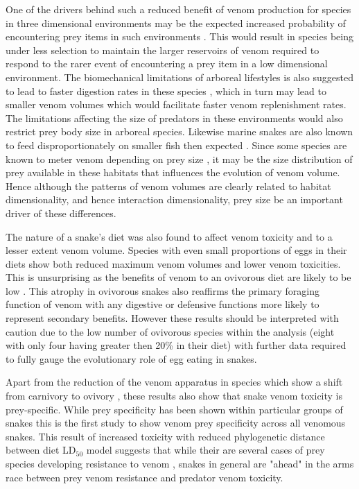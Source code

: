 One of the drivers behind such a reduced benefit of venom production for species in three dimensional environments may be the expected increased probability of encountering prey items in such environments \citep{pawar2012dimensionality}. This would result in species being under less selection to maintain the larger reservoirs of venom required to respond to the rarer event of encountering a prey item in a low dimensional environment. The biomechanical limitations of arboreal lifestyles is also suggested to lead to faster digestion rates in these species \citep{lillywhite2002patterns}, which in turn may lead to smaller venom volumes which would facilitate faster venom replenishment rates. The limitations affecting the size of predators in these environments would also restrict prey body size in arboreal species. Likewise marine snakes are also known to feed disproportionately on smaller fish then expected \citep{voris1981size}. Since some species are known to meter venom depending on prey size \citep{hayes1995venom}, it may be the size distribution of prey available in these habitats that influences the evolution of venom volume. Hence although the patterns of venom volumes are clearly related to habitat dimensionality, and hence interaction dimensionality, prey size be an important driver of these differences. %


The nature of a snake's diet was also found to affect venom toxicity and to a lesser extent venom volume. Species with even small proportions of eggs in their diets show both reduced maximum venom volumes and lower venom toxicities. This is unsurprising as the benefits of venom to an ovivorous diet are likely to be low \citep{li2005eggs}. This atrophy in ovivorous snakes also reaffirms the primary foraging function of venom with any digestive \citep{rodriguez1992venom} or defensive functions \citep{jansa2011adaptive} more likely to represent secondary benefits. However these results should be interpreted with caution due to the low number of ovivorous species within the analysis (eight with only four having greater then 20\% in their diet) with further data required to fully gauge the evolutionary role of egg eating in snakes. 


Apart from the reduction of the venom apparatus in species which show a shift from carnivory to ovivory \citep{li2005eggs}, these results also show that snake venom toxicity is prey-specific. While prey specificity has been shown within particular groups of snakes \citep{barlow2009coevolution,richards2012venom,daltry1996diet} this is the first study to show venom prey specificity across all venomous snakes. This result of increased toxicity with reduced phylogenetic distance between diet LD$_{50}$ model suggests that while their are several cases of prey species developing resistance to venom \citep{lillywhite2002patterns}, snakes in general are "ahead" in the arms race between prey venom resistance and predator venom toxicity.


